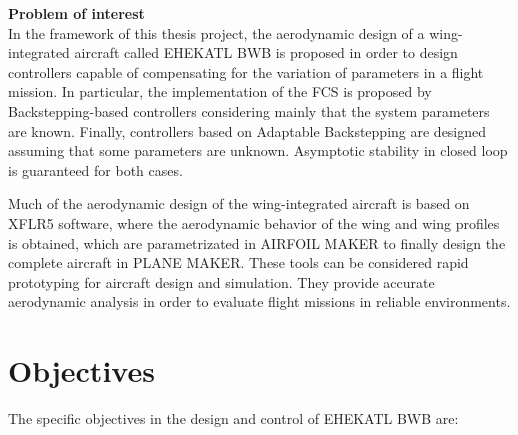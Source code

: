 \medskip

\textbf{Problem of interest}\\
In the framework of this thesis project, the aerodynamic design of a wing-integrated aircraft called EHEKATL BWB is proposed in order to design controllers capable of compensating for the variation of parameters in a flight mission. In particular, the implementation of the FCS is proposed by Backstepping-based controllers considering mainly that the system parameters are known. Finally, controllers based on Adaptable Backstepping are designed assuming that some parameters are unknown. Asymptotic stability in closed loop is guaranteed for both cases. 

Much of the aerodynamic design of the wing-integrated aircraft is based on XFLR5 software, where the aerodynamic behavior of the wing and wing profiles is obtained, which are parametrizated in AIRFOIL MAKER to finally design the complete aircraft in PLANE MAKER. These tools can be considered rapid prototyping for aircraft design and simulation. They provide accurate aerodynamic analysis in order to evaluate flight missions in reliable environments. 

\section{Objectives}

The specific objectives in the design and control of EHEKATL BWB are:

